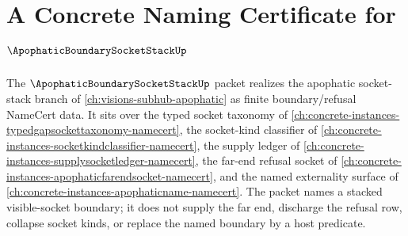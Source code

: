 \chapter{A Concrete Naming Certificate for $\ApophaticBoundarySocketStackUp$}
\label{ch:concrete-instances-apophatic-boundary-socket-stack-namecert}

The $\ApophaticBoundarySocketStackUp$ packet realizes the apophatic socket-stack branch of \autoref{ch:visions-subhub-apophatic} as finite boundary/refusal NameCert data. It sits over the typed socket taxonomy of \autoref{ch:concrete-instances-typedgapsockettaxonomy-namecert}, the socket-kind classifier of \autoref{ch:concrete-instances-socketkindclassifier-namecert}, the supply ledger of \autoref{ch:concrete-instances-supplysocketledger-namecert}, the far-end refusal socket of \autoref{ch:concrete-instances-apophaticfarendsocket-namecert}, and the named externality surface of \autoref{ch:concrete-instances-apophaticname-namecert}. The packet names a stacked visible-socket boundary; it does not supply the far end, discharge the refusal row, collapse socket kinds, or replace the named boundary by a host predicate.

